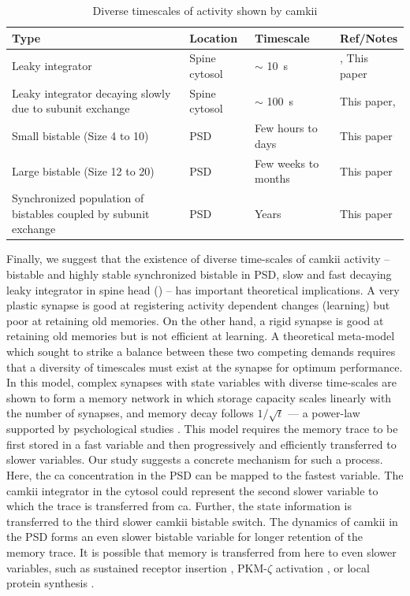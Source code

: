 \documentclass[9pt,lineno,doublespacing]{elife}
\begin{document}
\begin{table}[tb]
    \caption{Diverse timescales of activity shown by \gls{camkii}}\label{tab:diverse_timescales}
    \begin{tabular}{p{4cm} l l p{3cm}}
        \toprule
        {Type} & {Location}  & {Timescale} & {Ref/Notes} \\
        \midrule 
        Leaky integrator
        & Spine cytosol & $\sim$  \SI{10}{\second} 
            & \cite{chang_camkii_2017}, This paper \\
        Leaky integrator decaying slowly due to subunit exchange 
            & Spine cytosol & $\sim$ \SI{100}{\second} 
            & This paper, \cite{chang_camkii_2017} \\
        Small bistable (Size 4 to 10) & PSD & Few hours to days & This paper \\
        Large bistable (Size 12 to 20) & PSD &  Few weeks to months  & This paper \\
        Synchronized population of bistables coupled by subunit exchange & PSD & Years &
        This paper \\
        \bottomrule
    \end{tabular}
\end{table}

Finally, we suggest that the existence of diverse time-scales of
\gls{camkii} activity -- bistable and highly stable synchronized bistable in
PSD, slow and fast decaying leaky integrator in spine head
() -- has important theoretical implications. A very
plastic synapse is good at registering activity dependent changes (learning) but
poor at retaining old memories. On the other hand, a rigid synapse is good at
retaining old memories but is not efficient at learning. A theoretical
meta-model which sought to strike a balance between these two competing demands
requires that a diversity of timescales must exist at the synapse
\citep{benna_computational_2016} for optimum performance. In this model, complex
synapses with state variables with diverse time-scales are shown to form a
memory network in which storage capacity scales linearly with the number of
synapses, and memory decay follows \(1/\sqrt{t}\) --- a power-law supported by
psychological studies \citep{wixted_form_1991}. This model requires the memory
trace to be first stored in a fast variable and then progressively and
efficiently transferred to slower variables. Our study suggests a concrete
mechanism for such a process. Here, the \gls{ca} concentration in the PSD can be
mapped to the fastest variable. The \gls{camkii} integrator in the cytosol could
represent the second slower variable to which the trace is transferred from
\gls{ca}. Further, the state information is transferred to the third slower
\gls{camkii} bistable switch. The dynamics of \gls{camkii} in the PSD forms an
even slower bistable variable for longer retention of the memory trace. It is
possible that memory is transferred from here to even slower variables, such as
sustained receptor insertion \citep{hayer_molecular_2005}, PKM-$\zeta$
activation \citep{sacktor_memory_2012}, or local protein synthesis
\citep{aslam_translational_2009}.
\end{document}
